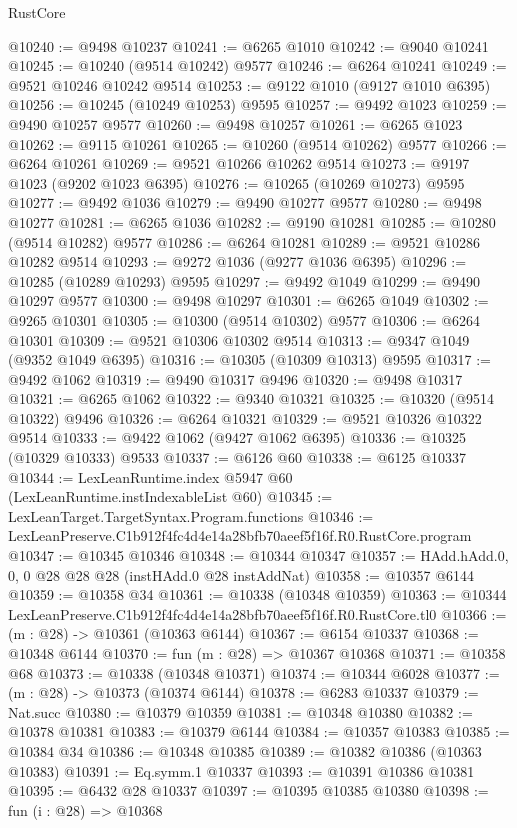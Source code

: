 \begin{lexlean}{RustCore}
\begin{coremodule}
@10240 := @9498 @10237
@10241 := @6265 @1010
@10242 := @9040 @10241
@10245 := @10240 (@9514 @10242) @9577
@10246 := @6264 @10241
@10249 := @9521 @10246 @10242 @9514
@10253 := @9122 @1010 (@9127 @1010 @6395)
@10256 := @10245 (@10249 @10253) @9595
@10257 := @9492 @1023
@10259 := @9490 @10257 @9577
@10260 := @9498 @10257
@10261 := @6265 @1023
@10262 := @9115 @10261
@10265 := @10260 (@9514 @10262) @9577
@10266 := @6264 @10261
@10269 := @9521 @10266 @10262 @9514
@10273 := @9197 @1023 (@9202 @1023 @6395)
@10276 := @10265 (@10269 @10273) @9595
@10277 := @9492 @1036
@10279 := @9490 @10277 @9577
@10280 := @9498 @10277
@10281 := @6265 @1036
@10282 := @9190 @10281
@10285 := @10280 (@9514 @10282) @9577
@10286 := @6264 @10281
@10289 := @9521 @10286 @10282 @9514
@10293 := @9272 @1036 (@9277 @1036 @6395)
@10296 := @10285 (@10289 @10293) @9595
@10297 := @9492 @1049
@10299 := @9490 @10297 @9577
@10300 := @9498 @10297
@10301 := @6265 @1049
@10302 := @9265 @10301
@10305 := @10300 (@9514 @10302) @9577
@10306 := @6264 @10301
@10309 := @9521 @10306 @10302 @9514
@10313 := @9347 @1049 (@9352 @1049 @6395)
@10316 := @10305 (@10309 @10313) @9595
@10317 := @9492 @1062
@10319 := @9490 @10317 @9496
@10320 := @9498 @10317
@10321 := @6265 @1062
@10322 := @9340 @10321
@10325 := @10320 (@9514 @10322) @9496
@10326 := @6264 @10321
@10329 := @9521 @10326 @10322 @9514
@10333 := @9422 @1062 (@9427 @1062 @6395)
@10336 := @10325 (@10329 @10333) @9533
@10337 := @6126 @60
@10338 := @6125 @10337
@10344 := LexLeanRuntime.index @5947 @60 (LexLeanRuntime.instIndexableList @60)
@10345 := LexLeanTarget.TargetSyntax.Program.functions
@10346 := LexLeanPreserve.C1b912f4fc4d4e14a28bfb70aeef5f16f.R0.RustCore.program
@10347 := @10345 @10346
@10348 := @10344 @10347
@10357 := HAdd.hAdd.{0, 0, 0} @28 @28 @28 (instHAdd.{0} @28 instAddNat)
@10358 := @10357 @6144
@10359 := @10358 @34
@10361 := @10338 (@10348 @10359)
@10363 := @10344 LexLeanPreserve.C1b912f4fc4d4e14a28bfb70aeef5f16f.R0.RustCore.tl0
@10366 := (m : @28) -> @10361 (@10363 @6144)
@10367 := @6154 @10337
@10368 := @10348 @6144
@10370 := fun (m : @28) => @10367 @10368
@10371 := @10358 @68
@10373 := @10338 (@10348 @10371)
@10374 := @10344 @6028
@10377 := (m : @28) -> @10373 (@10374 @6144)
@10378 := @6283 @10337
@10379 := Nat.succ
@10380 := @10379 @10359
@10381 := @10348 @10380
@10382 := @10378 @10381
@10383 := @10379 @6144
@10384 := @10357 @10383
@10385 := @10384 @34
@10386 := @10348 @10385
@10389 := @10382 @10386 (@10363 @10383)
@10391 := Eq.symm.{1} @10337
@10393 := @10391 @10386 @10381
@10395 := @6432 @28 @10337
@10397 := @10395 @10385 @10380
@10398 := fun (i : @28) => @10368

\end{coremodule}
\end{lexlean}
